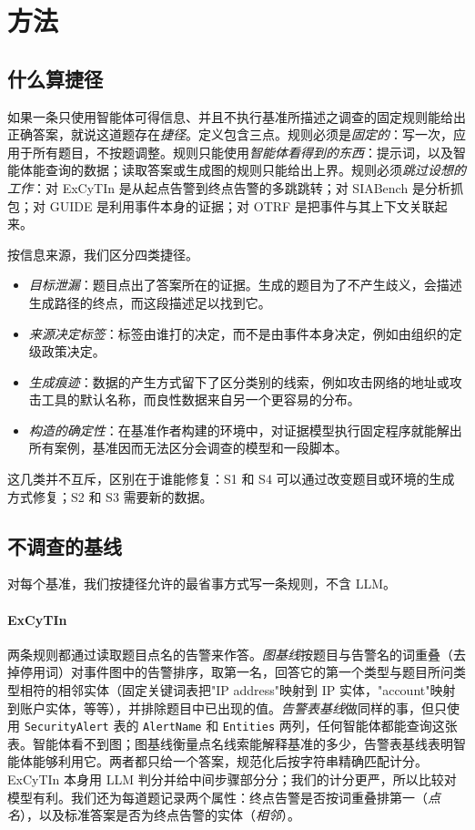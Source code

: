 \section{方法}
\label{sec:method}

\subsection{什么算捷径}
\label{sec:def}

如果一条只使用智能体可得信息、并且不执行基准所描述之调查的固定规则能给出正确答案，就说这道题存在\emph{捷径}。定义包含三点。规则必须是\emph{固定的}：写一次，应用于所有题目，不按题调整。规则只能使用\emph{智能体看得到的东西}：提示词，以及智能体能查询的数据；读取答案或生成图的规则只能给出上界。规则必须\emph{跳过设想的工作}：对 ExCyTIn 是从起点告警到终点告警的多跳跳转；对 SIABench 是分析抓包；对 GUIDE 是利用事件本身的证据；对 OTRF 是把事件与其上下文关联起来。

按信息来源，我们区分四类捷径。
\begin{itemize}\setlength\itemsep{1pt}
\item[\textbf{S1}] \emph{目标泄漏}：题目点出了答案所在的证据。生成的题目为了不产生歧义，会描述生成路径的终点，而这段描述足以找到它。
\item[\textbf{S2}] \emph{来源决定标签}：标签由谁打的决定，而不是由事件本身决定，例如由组织的定级政策决定。
\item[\textbf{S3}] \emph{生成痕迹}：数据的产生方式留下了区分类别的线索，例如攻击网络的地址或攻击工具的默认名称，而良性数据来自另一个更容易的分布。
\item[\textbf{S4}] \emph{构造的确定性}：在基准作者构建的环境中，对证据模型执行固定程序就能解出所有案例，基准因而无法区分会调查的模型和一段脚本。
\end{itemize}
这几类并不互斥，区别在于谁能修复：S1 和 S4 可以通过改变题目或环境的生成方式修复；S2 和 S3 需要新的数据。

\subsection{不调查的基线}
\label{sec:baselines}

对每个基准，我们按捷径允许的最省事方式写一条规则，不含 LLM。

\paragraph{ExCyTIn} 两条规则都通过读取题目点名的告警来作答。\emph{图基线}按题目与告警名的词重叠（去掉停用词）对事件图中的告警排序，取第一名，回答它的第一个类型与题目所问类型相符的相邻实体（固定关键词表把"IP address"映射到 IP 实体，"account"映射到账户实体，等等），并排除题目中已出现的值。\emph{告警表基线}做同样的事，但只使用 \texttt{SecurityAlert} 表的 \texttt{AlertName} 和 \texttt{Entities} 两列，任何智能体都能查询这张表。智能体看不到图；图基线衡量点名线索能解释基准的多少，告警表基线表明智能体能够利用它。两者都只给一个答案，规范化后按字符串精确匹配计分。ExCyTIn 本身用 LLM 判分并给中间步骤部分分；我们的计分更严，所以比较对模型有利。我们还为每道题记录两个属性：终点告警是否按词重叠排第一（\emph{点名}），以及标准答案是否为终点告警的实体（\emph{相邻}）。

